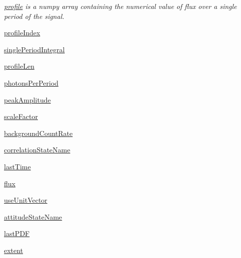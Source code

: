 \begin{DoxyCompactItemize}
\begin{DoxyCompactList}\small\item\em \hyperlink{classmodest_1_1signals_1_1periodicxraysource_1_1PeriodicXRaySource_a584d852c7e7be3d7a3ceb886575e9039}{profile} is a numpy array containing the numerical value of flux over a single period of the signal. \end{DoxyCompactList}\item 
\hyperlink{classmodest_1_1signals_1_1periodicxraysource_1_1PeriodicXRaySource_a008ccf30a31f3d1641df7c2504b95523}{profile\+Index}
\item 
\hyperlink{classmodest_1_1signals_1_1periodicxraysource_1_1PeriodicXRaySource_a387d8eb4fb739b49b8a51fe687a45082}{single\+Period\+Integral}
\item 
\hyperlink{classmodest_1_1signals_1_1periodicxraysource_1_1PeriodicXRaySource_ac1eeb6c4af724737f6568e2ad8f1e05c}{profile\+Len}
\item 
\hyperlink{classmodest_1_1signals_1_1periodicxraysource_1_1PeriodicXRaySource_ad8a98679b8f8b313457be3519bbc6fe2}{photons\+Per\+Period}
\item 
\hyperlink{classmodest_1_1signals_1_1periodicxraysource_1_1PeriodicXRaySource_a50a65021397b8cab83f2941e9b2d9036}{peak\+Amplitude}
\item 
\hyperlink{classmodest_1_1signals_1_1periodicxraysource_1_1PeriodicXRaySource_aa54bef8e6c3c0b7d9d8321897dd4eb27}{scale\+Factor}
\item 
\hyperlink{classmodest_1_1signals_1_1periodicxraysource_1_1PeriodicXRaySource_a27d4737b3a521750007ab14954802876}{background\+Count\+Rate}
\item 
\hyperlink{classmodest_1_1signals_1_1poissonsource_1_1DynamicPoissonSource_ac7f62303bb8a417a1ddefb032c707bcd}{correlation\+State\+Name}
\item 
\hyperlink{classmodest_1_1signals_1_1poissonsource_1_1PoissonSource_a34395fc83bd8743a0a5ee69f9392a606}{last\+Time}
\item 
\hyperlink{classmodest_1_1signals_1_1poissonsource_1_1PoissonSource_a6f2c657ad936b921715d826ac74f7fe5}{flux}
\item 
\hyperlink{classmodest_1_1signals_1_1pointsource_1_1PointSource_ac2dd52c4e1f7e6264c9d59a5ffbc43d1}{use\+Unit\+Vector}
\item 
\hyperlink{classmodest_1_1signals_1_1pointsource_1_1PointSource_a0924a2233bb4fd23e50d024e4f1b048e}{attitude\+State\+Name}
\item 
\hyperlink{classmodest_1_1signals_1_1pointsource_1_1PointSource_afde4a069238f53aaa11fbc54584b7a64}{last\+P\+DF}
\item 
\hyperlink{classmodest_1_1signals_1_1pointsource_1_1PointSource_a984b5a75c9e94cb3527707b9ac976f9e}{extent}
\end{DoxyCompactItemize}
